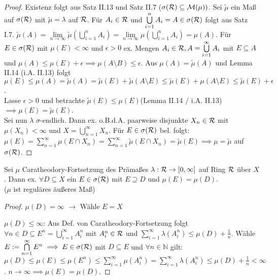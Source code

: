   \begin{proof}
    Existenz folgt aus Satz II.13 und Satz II.7 ($\sigma(\mathcal{R}) \subseteq \mathcal{M}(\mu))$. Sei $\tilde{\mu}$ ein Maß auf $\sigma(\mathcal{R})$ mit $\tilde{\mu} = \lambda$ auf $\mathcal{R}$. Für $A_i \in \mathcal{R}$ und $\bigcup\limits_{i = 1}^n A_i = A \in \sigma(\mathcal{R})$ folgt aus Satz I.7. $\tilde{\mu}(A) = \lim\limits_{n \to \infty} \tilde{\mu}(\bigcup\limits_{i=1}^n A_i) = \lim\limits_{n\to\infty} \mu (\bigcup\limits_{i=1}^n A_i) = \mu(A)$. Für $E \in \sigma(\mathcal{R})$ mit $\mu(E) < \infty$ und $\epsilon > 0$ ex. Mengen $A_i \in \mathcal{R}, A = \bigcup\limits_{i=1}^\infty A_i$ mit $E \subseteq A$ und $\mu(A) \leq \mu(E) + \epsilon \implies \mu(A\setminus B) \leq \epsilon$. Aus $\mu(A) = \tilde{\mu}(A)$ und Lemma II.14 (i.A. II.13) folgt \\    
    $\mu(E) \leq \mu(A) = \tilde{\mu}(A) = \tilde{\mu}(E) + \tilde{\mu}(A\setminus E) \leq \tilde{\mu}(E) + \mu(A\setminus E) \leq \tilde{\mu}(E) + \epsilon$. \\
    Lasse $\epsilon > 0$ und betrachte $\tilde{\mu}(E) \leq \mu(E)$(Lemma II.14 / i.A. II.13) $\implies \mu(E) = \tilde{\mu}(E)$. \\ Sei nun $\lambda$ $\sigma$-endlich. Dann ex. o.B.d.A. paarweise disjunkte $X_n \in \mathcal{R}$ mit $\mu(X_n) < \infty$ und $X = \bigcup\limits_{n=1}^{\infty} X_n$. Für $E \in \sigma(\mathcal{R})$ bel. folgt: \\
    $\mu(E) = \sum_{n=1}^{\infty}\mu(E\cap X_n) = \sum_{n=1}^{\infty}\tilde{\mu}(E\cap X_n) = \tilde{\mu}(E) \implies \mu = \tilde{\mu}$ auf $\sigma(\mathcal{R})$.
  \end{proof}

  \begin{theorem}
    Sei $\mu$ Caratheodory-Fortsetzung des Prämaßes $\lambda: \mathcal{R} \to [0,\infty]$ auf Ring $\mathcal{R}$ über $X$. Dann ex. $\forall D \subseteq X$ ein $E \in \sigma(\mathcal{R})$ mit $E \supseteq D$ und $\mu(E) = \mu(D)$.\\
    ($\mu$ ist \glqq reguläres \grqq äußeres Maß)
  \end{theorem}

  \begin{proof}
    \item $\mu(D) = \infty$ $\rightarrow$ Wähle $E = X$
    \item $\mu(D) \leq \infty$: Aus Def. von Caratheodory-Fortsetzung folgt $\forall n \in D \subseteq E^n = \bigcup\limits_{i=1}^{\infty}A_i^n$ mit $A_i^n \in \mathcal{R}$  und $\sum\limits_{i=1}^{\infty}\lambda(A_i^n) \leq \mu(D) + \frac{1}{n}$. Wähle $E := \bigcap\limits_{n=1}^{\infty} E^n \implies E \in \sigma(\mathcal{R})$ mit $D \subseteq E$ und $\forall n \in \mathbb{N}$ gilt: \\
    $\mu(D) \leq \mu(E) \leq \mu(E^n) \leq \sum\limits_{i=1}^{\infty}\mu(A_i^n) = \sum\limits_{i=1}^{\infty}\lambda(A_i^n) \leq \mu(D) + \frac{1}{n} < \infty$. $n \rightarrow \infty \implies \mu(E) = \mu(D)$.
  \end{proof}

